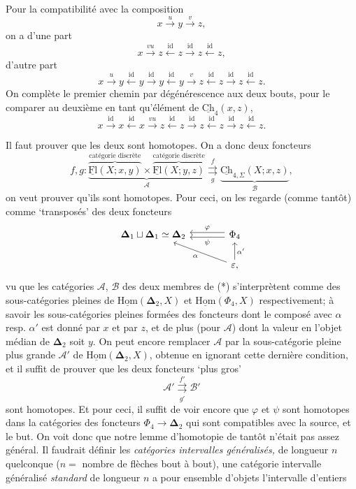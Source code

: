 \documentclass[11pt]{article}
\newcommand{\printedpage}[1]{\marginpar{\footnotesize p.~#1}}
\newcommand{\msp}[1]{\marginpar{\footnotesize [#1]}}
\newcommand{\uCh}{\underline{\mathrm{Ch}}}
\newcommand{\uHom}{\underline{\mathrm{Hom}}}
\newcommand{\uFl}{\underline{\mathrm{Fl}}}
\newcommand{\bDelta}{\boldsymbol{\Delta}}
\begin{document}
Pour la compatibilité avec la composition
\[
x \xrightarrow{u} y \xrightarrow{v} z,
\]
on a d'une part
\[
x \xrightarrow{vu} z \xleftarrow{\mathrm{id}} z \xrightarrow{\mathrm{id}} z \xleftarrow{\mathrm{id}} z,
\]
d'autre part
\[
x \xrightarrow{u} y \xleftarrow{\mathrm{id}} y \xrightarrow{\mathrm{id}} y \xleftarrow{\mathrm{id}} y \xrightarrow{v} z \xleftarrow{\mathrm{id}} z \xrightarrow{\mathrm{id}} z \xleftarrow{\mathrm{id}} z.
\]
On complète le premier chemin par dégénérescence aux deux bouts, pour le comparer au deuxième en tant qu'élément de $\uCh_4(x,z)$,
\[
x \xrightarrow{\mathrm{id}} x \xleftarrow{\mathrm{id}} x \xrightarrow{vu} z \xleftarrow{\mathrm{id}} z \xrightarrow{\mathrm{id}} z \xleftarrow{\mathrm{id}} z \xrightarrow{\mathrm{id}} z \xleftarrow{\mathrm{id}} z.
\]

\msp{page 24}Il faut prouver que les deux sont homotopes. On a donc deux foncteurs
\[
f,g : \underbrace{\overbrace{\uFl(X;x,y)}^{\text{catégorie discrète}} \times \overbrace{\uFl(X;y,z)}^{\text{catégorie discrète}}}_{\mathcal{A}} \underset{g}{\overset{f}{\rightrightarrows}} \underbrace{\uCh_{4,\Sigma}(X;x,z)}_{\mathcal{B}}, \tag*{$(\ast)$}
\]
on veut prouver qu'ils sont homotopes. Pour ceci, on les regarde (comme tantôt) comme `transposés' des deux foncteurs
\[
\begin{tikzcd}[column sep=large]
\bDelta_1 \sqcup \bDelta_1 \simeq \bDelta_2 & \Phi_4 \arrow[l, shift right, "\varphi"'] \arrow[l, shift left, "\psi"] \\
& \varepsilon, \arrow[ul, "\alpha"] \arrow[u, "\alpha'"']
\end{tikzcd}
\]
vu que les catégories $\mathcal{A}$, $\mathcal{B}$ des deux membres de (*) s'interprètent comme des sous-catégories pleines de $\uHom(\bDelta_2, X)$ et $\uHom(\Phi_4, X)$ respectivement; à savoir les sous-catégories pleines formées des foncteurs dont le composé avec $\alpha$ resp. $\alpha'$ est donné par $x$ et par $z$, et de plus (pour $\mathcal{A}$) dont la valeur en l'objet médian de $\bDelta_2$ soit $y$. On peut encore remplacer $\mathcal{A}$ par la sous-catégorie pleine plus grande $\mathcal{A}'$ de $\uHom(\bDelta_2, X)$, obtenue en ignorant cette dernière condition, et il suffit de prouver que les deux foncteurs `plus gros'
\printedpage{16}
\[
\mathcal{A}' \underset{g'}{\overset{f'}{\rightrightarrows}} \mathcal{B}'
\]
sont homotopes. Et pour ceci, il suffit de
\msp{page 25}voir encore que $\varphi$ et $\psi$ sont homotopes dans la catégories des foncteurs $\Phi_4 \longrightarrow \bDelta_2$ qui sont compatibles avec la source, et le but. On voit donc que notre lemme d'homotopie de tantôt n'était pas assez général. Il faudrait définir les \textit{catégories intervalles généralisés,} de longueur $n$ quelconque ($n =$ nombre de flèches bout à bout), une catégorie intervalle généralisé \textit{standard} de longueur $n$ a pour ensemble d'objets l'intervalle d'entiers %
\end{document}
